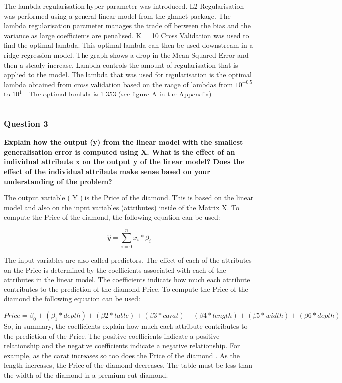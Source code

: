 \documentclass[
]{article}
\begin{document}
The lambda regularisation hyper-parameter was introduced. L2
Regularisation was performed using a general linear model from the
glmnet package. The lambda regularisation parameter manages the trade
off between the bias and the variance as large coefficients are
penalised. K = 10 Cross Validation was used to find the optimal lambda.
This optimal lambda can then be used downstream in a ridge regression
model. The graph shows a drop in the Mean Squared Error and then a
steady increase. Lambda controls the amount of regularisation that is
applied to the model. The lambda that was used for regularisation is the
optimal lambda obtained from cross validation based on the range of
lambdas from \(10 ^{-0.5}\) to \(10^1\) . The optimal lambda is
1.353.(see figure A in the Appendix)

\begin{center}\rule{0.5\linewidth}{0.5pt}\end{center}

\hypertarget{question-3}{%
\subsubsection{Question 3}\label{question-3}}

\textbf{Explain how the output (y) from the linear model with the
smallest generalisation} \textbf{error is computed using X. What is the
effect of an individual attribute x on the} \textbf{output y of the
linear model? Does the effect of the individual attribute make sense}
\textbf{based on your understanding of the problem?}

The output variable ( Y ) is the Price of the diamond. This is based on
the linear model and also on the input variables (attributes) inside of
the Matrix X. To compute the Price of the diamond, the following
equation can be used:

\[\hat{y} =  \sum_{i = 0}^{n} x_{i} * \beta_{i}\]

The input variables are also called predictors. The effect of each of
the attributes on the Price is determined by the coefficients associated
with each of the attributes in the linear model. The coefficients
indicate how much each attribute contributes to the prediction of the
diamond Price. To compute the Price of the diamond the following
equation can be used:

\[ Price = \beta_{0} + (\beta_{1} * depth) + (\beta{2} * table)  + (\beta{3} * carat) + (\beta{4} * length ) + (\beta{5} * width ) + (\beta{6} * depth )\]
So, in summary, the coefficients explain how much each attribute
contributes to the prediction of the Price. The positive coefficients
indicate a positive relationship and the negative coefficients indicate
a negative relationship. For example, as the carat increases so too does
the Price of the diamond . As the length increases, the Price of the
diamond decreases. The table must be less than the width of the diamond
in a premium cut diamond.
\end{document}
